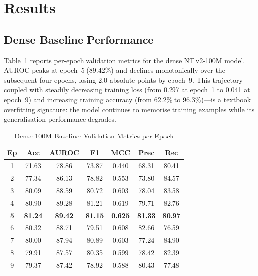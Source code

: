 \documentclass[journal]{IEEEtran}
\newcommand{\ntv}{NT\,v2-100M}
\begin{document}
\section{Results}
\label{sec:results}

\subsection{Dense Baseline Performance}

Table~\ref{tab:dense_val} reports per-epoch validation metrics
for the dense \ntv{} model.
AUROC peaks at epoch~5 (89.42\%) and declines monotonically
over the subsequent four epochs, losing 2.0 absolute points
by epoch~9.
This trajectory---coupled with steadily decreasing training
loss (from 0.297 at epoch~1 to 0.041 at epoch~9) and
increasing training accuracy (from 62.2\% to 96.3\%)---is
a textbook overfitting signature: the model continues to
memorise training examples while its generalisation
performance degrades.

\begin{table}[!t]
\centering
\caption{Dense 100M Baseline: Validation Metrics per Epoch}
\label{tab:dense_val}
\renewcommand{\arraystretch}{1.2}
\begin{tabular}{@{}ccccccc@{}}
\toprule
\textbf{Ep} & \textbf{Acc} & \textbf{AUROC} &
\textbf{F1} & \textbf{MCC} & \textbf{Prec} & \textbf{Rec} \\
\midrule
1 & 71.63 & 78.86 & 73.87 & 0.440 & 68.31 & 80.41 \\
2 & 77.34 & 86.13 & 78.82 & 0.553 & 73.80 & 84.57 \\
3 & 80.09 & 88.59 & 80.72 & 0.603 & 78.04 & 83.58 \\
4 & 80.90 & 89.28 & 81.21 & 0.619 & 79.71 & 82.76 \\
\textbf{5} & \textbf{81.24} & \textbf{89.42} & \textbf{81.15}
  & \textbf{0.625} & \textbf{81.33} & \textbf{80.97} \\
6 & 80.32 & 88.71 & 79.51 & 0.608 & 82.66 & 76.59 \\
7 & 80.00 & 87.94 & 80.89 & 0.603 & 77.24 & 84.90 \\
8 & 79.91 & 87.57 & 80.35 & 0.599 & 78.42 & 82.39 \\
9 & 79.37 & 87.42 & 78.92 & 0.588 & 80.43 & 77.48 \\
\bottomrule
\end{tabular}
\end{table}
\end{document}
